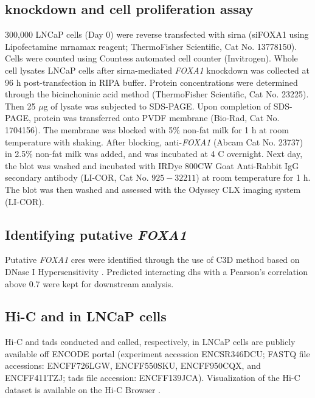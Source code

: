 \subsection{ knockdown and cell proliferation assay}

300,000 LNCaP cells (Day 0) were reverse transfected with \gls{sirna} (siFOXA1 using Lipofectamine \gls{mrna}max reagent; ThermoFisher Scientific, Cat No. 13778150).
Cells were counted using Countess automated cell counter (Invitrogen).
Whole cell lysates LNCaP cells after \gls{sirna}-mediated \emph{FOXA1} knockdown was collected at 96 h post-transfection in RIPA buffer.
Protein concentrations were determined through the bicinchoninic acid method (ThermoFisher Scientific, Cat No. 23225).
Then 25 $\mu$g of lysate was subjected to SDS-PAGE.
Upon completion of SDS-PAGE, protein was transferred onto PVDF membrane (Bio-Rad, Cat No. 1704156).
The membrane was blocked with 5\% non-fat milk for 1 h at room temperature with shaking.
After blocking, anti-\emph{FOXA1} (Abcam Cat No. 23737) in 2.5\% non-fat milk was added, and was incubated at 4 \textdegree C overnight.
Next day, the blot was washed and incubated with IRDye 800CW Goat Anti-Rabbit IgG secondary antibody (LI-COR, Cat No. $925-32211$) at room temperature for 1 h.
The blot was then washed and assessed with the Odyssey CLX imaging system (LI-COR).

\subsection{Identifying putative \emph{FOXA1} }

Putative \emph{FOXA1} \glspl{cre} were identified through the use of C3D method based on DNase I Hypersensitivity \cite{mehdiC3DToolPredict2019}.
Predicted interacting \gls{dhs} with a Pearson's correlation above 0.7 \cite{thurmanAccessibleChromatinLandscape2012} were kept for downstream analysis.

\subsection{Hi-C and  in LNCaP cells}

Hi-C and \glspl{tad} conducted and called, respectively, in LNCaP cells are publicly available off ENCODE portal (experiment accession ENCSR346DCU; FASTQ file accessions: ENCFF726LGW, ENCFF550SKU, ENCFF950CQX, and ENCFF411TZJ; \glspl{tad} file accession: ENCFF139JCA).
Visualization of the Hi-C dataset is available on the Hi-C Browser \cite{wang3DGenomeBrowser2018}.

